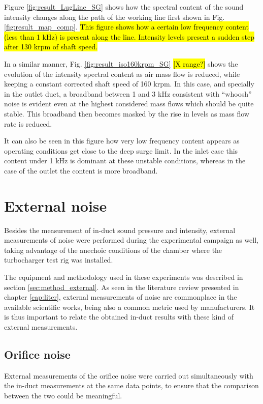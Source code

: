 Figure \ref{fig:result_LugLine_SG} shows how the spectral content of the sound intensity changes along the path of the working line first shown in Fig. \ref{fig:result_map_comp}. \hl{This figure shows how a certain low frequency content (less than 1 kHz) is present along the line. Intensity levels present a sudden step after 130 krpm of shaft speed.}

In a similar manner, Fig. \ref{fig:result_iso160krpm_SG} \hl{[X range?]} shows the evolution of the intensity spectral content as air mass flow is reduced, while keeping a constant corrected shaft speed of 160 krpm. In this case, and specially in the outlet duct, a broadband between 1 and 3 kHz consistent with ``whoosh'' noise is evident even at the highest considered mass flows which should be quite stable. This broadband then becomes masked by the rise in levels as mass flow rate is reduced.

It can also be seen in this figure how very low frequency content appears as operating conditions get close to the deep surge limit. In the inlet case this content under 1 kHz is dominant at these unstable conditions, whereas in the case of the outlet the content is more broadband. 

\section{External noise}
\label{sec:external_results}

Besides the measurement of in-duct sound pressure and intensity, external measurements of noise were performed during the experimental campaign as well, taking advantage of the anechoic conditions of the chamber where the turbocharger test rig was installed. 

The equipment and methodology used in these experiments was described in section \ref{sec:method_external}. As seen in the literature review presented in chapter \ref{cap:liter}, external measurements of noise are commonplace in the available scientific works, being also a common metric used by manufacturers. It is thus important to relate the obtained in-duct results with these kind of external measurements.

\subsection{Orifice noise}

External measurements of the orifice noise were carried out simultaneously with the in-duct measurements at the same data points, to ensure that the comparison between the two could be meaningful. 

